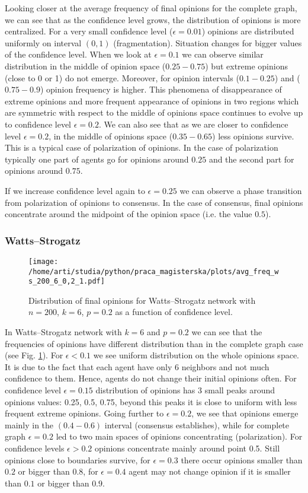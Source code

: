 \documentclass[a4paper, 12pt]{article}
\begin{document}
Looking closer at the average frequency of final opinions for the complete graph, we can see that as the confidence level grows, the distribution of opinions is more centralized. For a very small confidence level ($\epsilon=0.01$) opinions are distributed uniformly on interval $(0, 1)$ (fragmentation). Situation changes for bigger values of the confidence level. When we look at $\epsilon=0.1$ we can observe similar distribution in the middle of opinion space ($0.25-0.75$) but extreme opinions (close to 0 or 1) do not emerge. Moreover, for opinion intervals ($0.1-0.25$) and ($0.75-0.9$) opinion frequency is higher. This phenomena of disappearance of extreme opinions and more frequent appearance of opinions in two regions which are symmetric with respect to the middle of opinions space continues to evolve up to confidence level $\epsilon=0.2$. We can also see that as we are closer to confidence level $\epsilon=0.2$, in the middle of opinions space ($0.35-0.65$) less opinions survive. This is a typical case of polarization of opinions. In the case of polarization typically one part of agents go for opinions around $0.25$ and the second part for opinions around $0.75$.
\indent

If we increase confidence level again to $\epsilon=0.25$ we can observe a phase transition from polarization of opinions to consensus. In the case of consensus, final opinions concentrate around the midpoint of the opinion space (i.e. the value $0.5$).


\subsubsection{Watts--Strogatz}

\begin{figure}[H]
		\centering
		\texttt{[image: /home/arti/studia/python/praca\_magisterska/plots/avg\_freq\_ws\_200\_6\_0,2\_1.pdf]}
		\caption{Distribution of final opinions for Watts--Strogatz network with $n=200$, $k=6$, $p=0.2$ as a function of confidence level.}
		\label{f6}
\end{figure}

In Watts--Strogatz network with $k=6$ and $p=0.2$ we can see that the frequencies of opinions have different distribution than in the complete graph case (see Fig. \ref{f6}). For $\epsilon < 0.1$ we see uniform distribution on the whole opinions space. It is due to the fact that each agent have only 6 neighbors and not much confidence to them. Hence, agents do not change their initial opinions often. For confidence level $\epsilon=0.15$ distribution of opinions has 3 small peaks around opinions values: 0.25, 0.5, 0.75, beyond this peaks it is close to uniform with less frequent extreme opinions. Going further to $\epsilon=0.2$, we see that opinions emerge mainly in the $(0.4-0.6)$ interval (consensus establishes), while for complete graph $\epsilon=0.2$ led to two main spaces of opinions concentrating (polarization). For confidence levels $\epsilon>0.2$ opinions concentrate mainly around point 0.5. Still opinions close to boundaries survive, for $\epsilon=0.3$ there occur opinions smaller than $0.2$ or bigger than $0.8$, for $\epsilon=0.4$ agent may not change opinion if it is smaller than $0.1$ or bigger than $0.9$.
\end{document}
